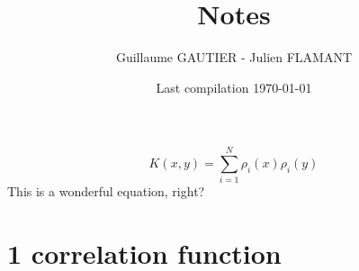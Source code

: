 \documentclass{article}
\begin{document}

\title{Notes
}

\author{Guillaume GAUTIER - Julien FLAMANT}



\date{
   Last compilation \today
      }

\maketitle
{}

\begin{equation}
    K(x,y) = \sum_{i=1}^N \rho_i(x) \rho_i(y)
\end{equation}
This is a wonderful equation, right? 
\section{1 correlation function} %
\label{sec:1_correlation_function}
\end{document}
